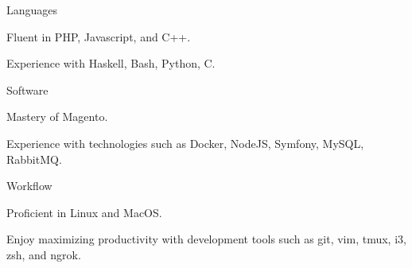 \begin{cvskills}
  \cvskill
    {Languages}
    {
      \begin{cvitems}
        \item Fluent in PHP, Javascript, and C++.
        \item Experience with Haskell, Bash, Python, C.
      \end{cvitems}
    }
  \cvskill
    {Software}
    {
      \begin{cvitems}
        \item Mastery of Magento.
        \item Experience with technologies such as Docker, NodeJS, Symfony, MySQL, RabbitMQ.
      \end{cvitems}
    }
  \cvskill
    {Workflow}
    {
      \begin{cvitems}
        \item Proficient in Linux and MacOS.
        \item Enjoy maximizing productivity with development tools such as git, vim, tmux, i3, zsh, and ngrok.
      \end{cvitems}
    }
\end{cvskills}
